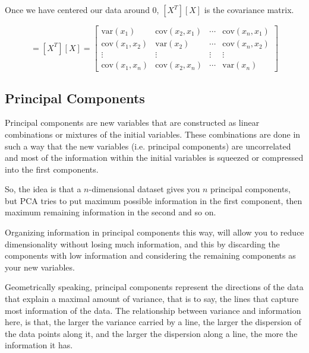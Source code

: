 Once we have centered our data around 0, $[X^T][X]$ is the covariance matrix.

\begin{equation}
[\Sigma]=[X^T][X] =
\begin{bmatrix}
\textrm{var}(x_1) & \textrm{cov}(x_2, x_1) & \cdots & \textrm{cov}(x_n, x_1) \\
\textrm{cov}(x_1, x_2) & \textrm{var}(x_2) & \cdots & \textrm{cov}(x_n, x_2) \\
\vdots & \vdots & \vdots & \vdots \\
\textrm{cov}(x_1, x_n) & \textrm{cov}(x_2, x_n) & \cdots & \textrm{var}(x_n)
\end{bmatrix}
\end{equation}

\subsection{Principal Components}

Principal components are new variables that are constructed as linear combinations or mixtures of the initial variables. These combinations are done in such a way that the new variables (i.e. principal components) are uncorrelated and most of the information within the initial variables is squeezed or compressed into the first components. 

So, the idea is that a $n$-dimensional dataset gives you $n$ principal components, but PCA tries to put maximum possible information in the first component, then maximum remaining information in the second and so on.

Organizing information in principal components this way, will allow you to reduce dimensionality without losing much information, and this by discarding the components with low information and considering the remaining components as your new variables.

Geometrically speaking, principal components represent the directions of the data that explain a maximal amount of variance, that is to say, the lines that capture most information of the data. The relationship between variance and information here, is that, the larger the variance carried by a line, the larger the dispersion of the data points along it, and the larger the dispersion along a line, the more the information it has.

